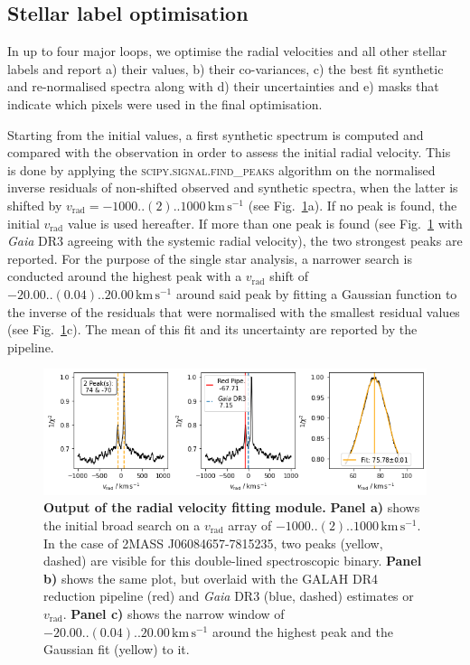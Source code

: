 \documentclass[
  journal=pasa,
  manuscript=research-paper, %
  year=2024,
  volume=37
]{cup-journal}
\newcommand{\vrad}{$v_\mathrm{rad}$\xspace}
\newcommand{\Gaia}{\textit{Gaia}\xspace}
\newcommand{\kms}{\,\mathrm{km\,s^{-1}}}	%
\begin{document}
\subsection{Stellar label optimisation}
\label{sec:stellar_label_optimisation}

In up to four major loops, we optimise the radial velocities and all other stellar labels and report a) their values, b) their co-variances, c) the best fit synthetic and re-normalised spectra along with d) their uncertainties and e) masks that indicate which pixels were used in the final optimisation.

Starting from the initial values, a first synthetic spectrum is computed and compared with the observation in order to assess the initial radial velocity. This is done by applying the \textsc{scipy.signal.find\_peaks} algorithm on the normalised inverse residuals of non-shifted observed and synthetic spectra, when the latter is shifted by $v_\text{rad} = -1000..(2)..1000\kms$ (see Fig.~\ref{fig:181221003101356_single_fit_rv}a). If no peak is found, the initial \vrad value is used hereafter. If more than one peak is found (see Fig.~\ref{fig:181221003101356_single_fit_rv} with \Gaia DR3 agreeing with the systemic radial velocity), the two strongest peaks are reported. For the purpose of the single star analysis, a narrower search is conducted around the highest peak with a \vrad shift of $-20.00..(0.04)..20.00\kms$ around said peak by fitting a Gaussian function to the inverse of the residuals that were normalised with the smallest residual values (see Fig.~\ref{fig:181221003101356_single_fit_rv}c). The mean of this fit and its uncertainty are reported by the pipeline.

\begin{figure}[hbt]
\centering
\includegraphics[width=\textwidth]{figures/181221003101356_single_fit_rv.png}
\caption{\textbf{Output of the radial velocity fitting module.} \textbf{Panel a)} shows the initial broad search on a \vrad array of $-1000..(2)..1000\kms$. In the case of 2MASS J06084657-7815235, two peaks (yellow, dashed) are visible for this double-lined spectroscopic binary. \textbf{Panel b)} shows the same plot, but overlaid with the GALAH DR4 reduction pipeline (red) and \Gaia DR3 (blue, dashed) estimates or \vrad. \textbf{Panel c)} shows the narrow window of $-20.00..(0.04)..20.00\kms$ around the highest peak and the Gaussian fit (yellow) to it.}
\label{fig:181221003101356_single_fit_rv}
\end{figure}
\end{document}
